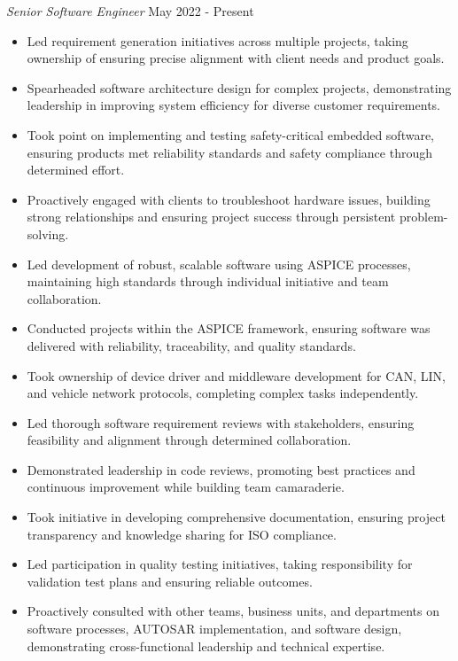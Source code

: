 \noindent
\textit{Senior Software Engineer} \hfill May 2022 - Present \\
\begin{itemize}[leftmargin=*,noitemsep,topsep=3pt]
    \item Led requirement generation initiatives across multiple projects, taking ownership of ensuring precise alignment with client needs and product goals.
    \item Spearheaded software architecture design for complex projects, demonstrating leadership in improving system efficiency for diverse customer requirements.
    \item Took point on implementing and testing safety-critical embedded software, ensuring products met reliability standards and safety compliance through determined effort.
    \item Proactively engaged with clients to troubleshoot hardware issues, building strong relationships and ensuring project success through persistent problem-solving.
    \item Led development of robust, scalable software using ASPICE processes, maintaining high standards through individual initiative and team collaboration.
    \item Conducted projects within the ASPICE framework, ensuring software was delivered with reliability, traceability, and quality standards.
    \item Took ownership of device driver and middleware development for CAN, LIN, and vehicle network protocols, completing complex tasks independently.
    \item Led thorough software requirement reviews with stakeholders, ensuring feasibility and alignment through determined collaboration.
    \item Demonstrated leadership in code reviews, promoting best practices and continuous improvement while building team camaraderie.
    \item Took initiative in developing comprehensive documentation, ensuring project transparency and knowledge sharing for ISO compliance.
    \item Led participation in quality testing initiatives, taking responsibility for validation test plans and ensuring reliable outcomes.
    \item Proactively consulted with other teams, business units, and departments on software processes, AUTOSAR implementation, and software design, demonstrating cross-functional leadership and technical expertise.
\end{itemize}